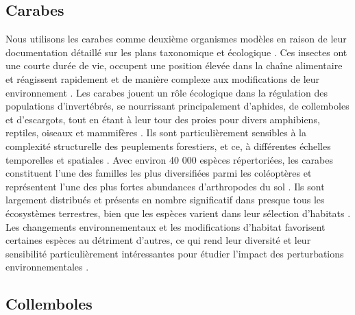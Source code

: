 \subsection*{Carabes}

Nous utilisons les carabes comme deuxième organismes modèles en raison de leur documentation détaillé sur les plans taxonomique et écologique \citep{loveiEcologyBehaviorGround1996}. 
Ces insectes ont une courte durée de vie, occupent une position élevée dans la chaîne alimentaire et réagissent rapidement et de manière complexe aux modifications de leur environnement \citep{loveiEcologyBehaviorGround1996}.
Les carabes jouent un rôle écologique dans la régulation des populations d'invertébrés, se nourrissant principalement d'aphides, de collemboles et d'escargots, tout en étant à leur tour des proies pour divers amphibiens, reptiles, oiseaux et mammifères \citep{loveiEcologyBehaviorGround1996}. 
Ils sont particulièrement sensibles à la complexité structurelle des peuplements forestiers, et ce, à différentes échelles temporelles et spatiales \citep{Butterfield1995Carabidbeetle,loveiEcologyBehaviorGround1996,Niemela2007effectsforestry}.
Avec environ 40 000 espèces répertoriées, les carabes constituent l'une des familles les plus diversifiées parmi les coléoptères et représentent l'une des plus fortes abundances d'arthropodes du sol \citep{Erwin1985taxonpulse,loveiEcologyBehaviorGround1996,Rochefort2006GroundBeetle}. 
Ils sont largement distribués et présents en nombre significatif dans presque tous les écosystèmes terrestres, bien que les espèces varient dans leur sélection d'habitats \citep{loveiEcologyBehaviorGround1996,kotzeFortyYearsCarabid2011a,Larochelle2003naturalhistory}. 
Les changements environnementaux et les modifications d'habitat favorisent certaines espèces au détriment d'autres, ce qui rend leur diversité et leur sensibilité particulièrement intéressantes pour étudier l'impact des perturbations environnementales \citep{Rainio2003Groundbeetles}.

\subsection*{Collemboles}

